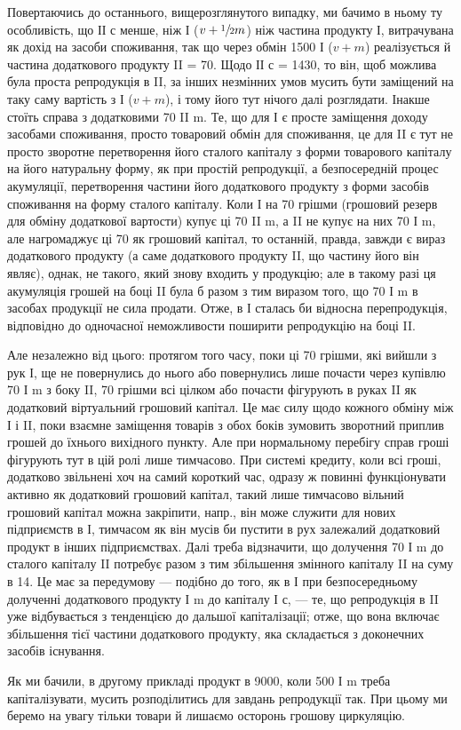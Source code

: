 Повертаючись до останнього, вищерозглянутого випадку, ми бачимо
в ньому ту особливість, що ІІ с менше, ніж І ($v + \sfrac{1}{2} m$) ніж частина
продукту І, витрачувана як дохід на засоби споживання, так що через
обмін 1500 І ($v + m$) реалізується й частина додаткового продукту II = 70.
Щодо ІІ с = 1430, то він, щоб можлива була проста репродукція в II,
за інших незмінних умов мусить бути заміщений на таку саму вартість
з І ($v + m$), і тому його тут нічого далі розглядати. Інакше стоїть
справа з додатковими 70 II m. Те, що для І є просте заміщення доходу
засобами споживання, просто товаровий обмін для споживання, це для II
є тут не просто зворотне перетворення його сталого капіталу з форми
товарового капіталу на його натуральну форму, як при простій репродукції,
а безпосередній процес акумуляції, перетворення частини його
додаткового продукту з форми засобів споживання на форму сталого
капіталу. Коли І на 70 грішми (грошовий резерв для обміну
додаткової вартости) купує ці 70 II m, а II не купує на них 70 І m, але
нагромаджує ці 70 як грошовий капітал, то останній, правда,
завжди є вираз додаткового продукту (а саме додаткового продукту II,
що частину його він являє), однак, не такого, який знову входить у
продукцію; але в такому разі ця акумуляція грошей на боці II була б
разом з тим виразом того, що 70 І m в засобах продукції не сила продати.
Отже, в І сталась би відносна перепродукція, відповідно до одночасної
неможливости поширити репродукцію на боці II.

Але незалежно від цього: протягом того часу, поки ці 70 грішми,
які вийшли з рук І, ще не повернулись до нього або повернулись лише
почасти через купівлю 70 І m з боку II, 70 грішми всі цілком або почасти
фігурують в руках II як додатковий віртуальний грошовий капітал.
Це має силу щодо кожного обміну між І і II, поки взаємне заміщення
товарів з обох боків зумовить зворотний приплив грошей до їхнього
вихідного пункту. Але при нормальному перебігу справ гроші
фігурують тут в цій ролі лише тимчасово. При системі кредиту, коли
всі гроші, додатково звільнені хоч на самий короткий час, одразу ж повинні
функціонувати активно як додатковий грошовий капітал, такий лише
тимчасово вільний грошовий капітал можна закріпити, напр., він може
служити для нових підприємств в І, тимчасом як він мусів би пустити в
рух залежалий додатковий продукт в інших підприємствах. Далі треба
відзначити, що долучення 70 І m до сталого капіталу II потребує разом
з тим збільшення змінного капіталу II на суму в 14. Це має за передумову
— подібно до того, як в І при безпосередньому долученні додаткового
продукту І m до капіталу І с, — те, що репродукція в II уже відбувається
з тенденцією до дальшої капіталізації; отже, що вона включає збільшення
тієї частини додаткового продукту, яка складається з доконечних засобів
існування.

Як ми бачили, в другому прикладі продукт в 9000, коли 500 І m
треба капіталізувати, мусить розподілитись для завдань репродукції так.
При цьому ми беремо на увагу тільки товари й лишаємо осторонь грошову
циркуляцію.
